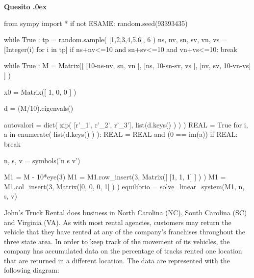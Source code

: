 \documentclass[11pt,twoside,a4paper]{article}
\newcounter{quesito}
\newenvironment{question}{\bigskip\addtocounter{quesito}{1}\bigskip\bigskip\par\textbf{Quesito \thequesito.\kern0ex}}{\par\vspace{\parskip}}
\begin{document}
\clearpage
\begin{question}
\def\Pr{{\rm Pr\,}}
\def\pyl#1{\py{latex(#1) } }
\everymath{\displaystyle}
\def\nicefrac#1#2{#1/#2}
\renewcommand{\arraystretch}{1.3}
\begin{pycode}
from sympy import *
if not ESAME: random.seed(93393435)

while True :
    tp  =  random.sample( [1,2,3,4,5,6], 6 ) 
    ns, nv, sn, sv, vn, vs = [Integer(i) for i in tp] 
    if ns+nv<=10 and sn+sv<=10 and vn+vs<=10: break

while True :    
    M = Matrix([ [10-ns-nv, sn,        vn       ],
                [ns,         10-sn-sv, vs       ],
                [nv,         sv,        10-vn-vs] ] )

    x0 = Matrix([ 1, 0, 0 ] )

    d = (M/10).eigenvals()

    autovalori = dict( zip( [r'\lambda_1', r'\lambda_2', r'\lambda_3'], 
                           list(d.keys() ) ) )
    REAL = True
    for i, a in enumerate( list(d.keys() ) ):
        REAL = REAL and (0 == im(a))
    if REAL: break

n, s, v = symbols('n s v')

M1 = M - 10*eye(3)
M1 = M1.row_insert(3, Matrix([ [1, 1, 1] ] ) )
M1 = M1.col_insert(3, Matrix([0, 0, 0, 1] ) )
equilibrio = solve_linear_system(M1, n, s, v)

\end{pycode}
John’s Truck Rental does business in North Carolina ({\sf NC}), South Carolina ({\sf SC}) and Virginia ({\sf VA}). As with most rental agencies, customers may return the vehicle that they have rented at any of the company’s franchises throughout the three state area. In order to keep track of the movement of its vehicles, the company has accumulated data on the percentage of tracks rented one location that are  returned in a different location. The data are represented with the following diagram:

\hfil
{}
\end{question}
\end{document}
